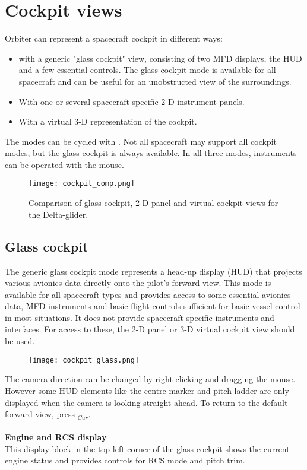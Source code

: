 \documentclass[Orbiter User Manual.tex]{subfiles}
\begin{document}
\section{Cockpit views}
\label{sec:cockpit_views}
Orbiter can represent a spacecraft cockpit in different ways:

\begin{itemize}
\item with a generic "glass cockpit" view, consisting of two MFD displays, the HUD and a few essential controls. The glass cockpit mode is available for all spacecraft and can be useful for an unobstructed view of the surroundings.
\item With one or several spacecraft-specific 2-D instrument panels.
\item With a virtual 3-D representation of the cockpit.
\end{itemize}

\noindent
The modes can be cycled with . Not all spacecraft may support all cockpit modes, but the glass cockpit is always available. In all three modes, instruments can be operated with the mouse.

\begin{figure}[H]
  \centering
  \texttt{[image: cockpit\_comp.png]}
  \caption{Comparison of glass cockpit, 2-D panel and virtual cockpit views for the Delta-glider.}
\end{figure}


\subsection{Glass cockpit}
\label{ssec:glass_cockpit}
The generic glass cockpit mode represents a head-up display (HUD) that projects various avionics data directly onto the pilot's forward view. This mode is available for all spacecraft types and provides access to some essential avionics data, MFD instruments and basic flight controls sufficient for basic vessel control in most situations. It does not provide spacecraft-specific instruments and interfaces. For access to these, the 2-D panel or 3-D virtual cockpit view should be used.

\begin{figure}[H]
  \centering
  \texttt{[image: cockpit\_glass.png]}
\end{figure}

\noindent
The camera direction can be changed by right-clicking and dragging the mouse. However some HUD elements like the centre marker and pitch ladder are only displayed when the camera is looking straight ahead. To return to the default forward view, press \Home$_{Cur}$.\\
\\
\textbf{Engine and RCS display}\\
This display block in the top left corner of the glass cockpit shows the current engine status and provides controls for RCS mode and pitch trim.
\end{document}
